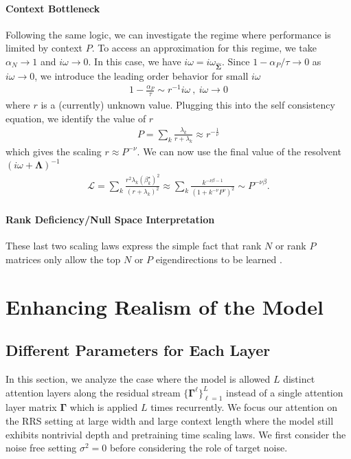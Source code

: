 \documentclass{article} %
\begin{document}
\paragraph{Context Bottleneck} Following the same logic, we can investigate the regime where performance is limited by context $P$. To access an approximation for this regime, we take $\alpha_N \to 1$ and $i\omega \to 0$. In this case, we have $i \omega = i\omega_{\hat{\bm\Sigma}}$. Since $1-\alpha_P/\tau \to 0$ as $i\omega\to 0$, we introduce the leading order behavior for small $i\omega$
\begin{align}
    1- \frac{\alpha_P} \tau \sim r^{-1} i\omega \ , \  i\omega \to 0
\end{align}
where $r$ is a (currently) unknown value. Plugging this into the self consistency equation, we identify the value of $r$
\begin{align}
    P = \sum_k \frac{\lambda_k}{r + \lambda_k }  \approx r^{ - \frac{1}{\nu }}
\end{align}
which gives the scaling $r \approx P^{-\nu}$. We can now use the final value of the resolvent $\left( i\omega + \bm\Lambda \right)^{-1}$
\begin{align}
    \mathcal L = \sum_k \frac{r^2 \lambda_k (\beta^\star_k)^2}{(r+\lambda_k)^2} \approx \sum_k \frac{k^{-\nu \beta - 1}}{(1 + k^{-\nu } P^\nu )^2} \sim P^{- \nu \beta} .
\end{align}

\paragraph{Rank Deficiency/Null Space Interpretation} These last two scaling laws express the simple fact that rank $N$ or rank $P$ matrices only allow the top $N$ or $P$ eigendirections to be learned \citep{bordelon2024dynamical}. 

\section{Enhancing Realism of the Model}

\subsection{Different Parameters for Each Layer}\label{app:diff_layers}

In this section, we analyze the case where the model is allowed $L$ distinct attention layers along the residual stream $\{ \bm\Gamma^\ell \}_{\ell=1}^L$ instead of a single attention layer matrix $\bm\Gamma$ which is applied $L$ times recurrently. We focus our attention on the RRS setting at large width and large context length where the model still exhibits nontrivial depth and pretraining time scaling laws. We first consider the noise free setting $\sigma^2 = 0$ before considering the role of target noise. 
\end{document}
